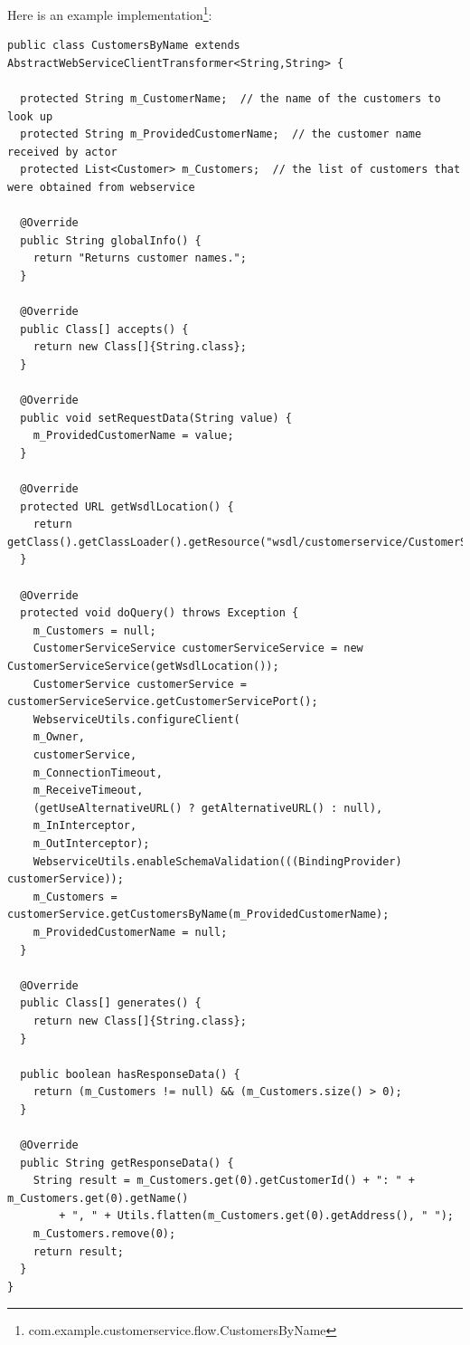 \documentclass[a4paper]{book}
\begin{document}
Here is an example 
implementation\footnote{com.example.customerservice.flow.CustomersByName}:
{\scriptsize
\begin{verbatim}
public class CustomersByName extends AbstractWebServiceClientTransformer<String,String> {
  
  protected String m_CustomerName;  // the name of the customers to look up
  protected String m_ProvidedCustomerName;  // the customer name received by actor
  protected List<Customer> m_Customers;  // the list of customers that were obtained from webservice

  @Override
  public String globalInfo() {
    return "Returns customer names.";
  }

  @Override
  public Class[] accepts() {
    return new Class[]{String.class};
  }

  @Override
  public void setRequestData(String value) {
    m_ProvidedCustomerName = value;
  }

  @Override
  protected URL getWsdlLocation() {
    return getClass().getClassLoader().getResource("wsdl/customerservice/CustomerService.wsdl");
  }

  @Override
  protected void doQuery() throws Exception {
    m_Customers = null;
    CustomerServiceService customerServiceService = new CustomerServiceService(getWsdlLocation());
    CustomerService customerService = customerServiceService.getCustomerServicePort();
    WebserviceUtils.configureClient(
	m_Owner,
	customerService,
	m_ConnectionTimeout,
	m_ReceiveTimeout,
	(getUseAlternativeURL() ? getAlternativeURL() : null),
	m_InInterceptor,
	m_OutInterceptor);
    WebserviceUtils.enableSchemaValidation(((BindingProvider) customerService));
    m_Customers = customerService.getCustomersByName(m_ProvidedCustomerName);
    m_ProvidedCustomerName = null;
  }

  @Override
  public Class[] generates() {
    return new Class[]{String.class};
  }
  
  public boolean hasResponseData() {
    return (m_Customers != null) && (m_Customers.size() > 0);
  }

  @Override
  public String getResponseData() {
    String result = m_Customers.get(0).getCustomerId() + ": " + m_Customers.get(0).getName() 
        + ", " + Utils.flatten(m_Customers.get(0).getAddress(), " ");
    m_Customers.remove(0);
    return result;
  }
}
\end{verbatim}
}
%
\end{document}
